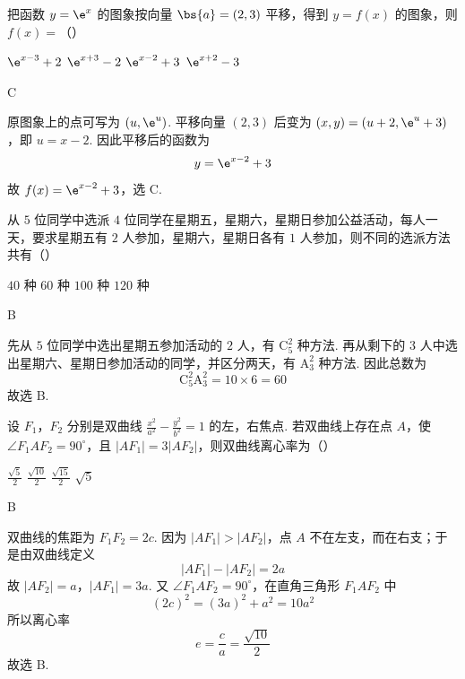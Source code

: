 \begin{problem}
把函数 \( y = \e^{x} \) 的图象按向量 \( \bs{a} = (2,3) \) 平移，得到 \( y = f(x) \) 的图象，则 \( f(x) = \)（\quad）

\choices
    {\(\e^{x - 3} + 2\)}
    {\(\e^{x + 3} - 2\)}
    {\(\e^{x - 2} + 3\)}
    {\(\e^{x + 2} - 3\)}
\end{problem}

\begin{answer}
C
\end{answer}

\begin{solution}
原图象上的点可写为 \((u,\e^u)\). 平移向量 \((2,3)\) 后变为 \((x,y)=(u+2,\e^u+3)\)，即 \(u=x-2\). 因此平移后的函数为
\[
y=\e^{x-2}+3
\]
故 \(f(x)=\e^{x-2}+3\)，选 C.
\end{solution}

\begin{problem}
从 \(5\) 位同学中选派 \(4\) 位同学在星期五，星期六，星期日参加公益活动，每人一天，要求星期五有 \(2\) 人参加，星期六，星期日各有 \(1\) 人参加，则不同的选派方法共有（\quad）

\choices
    {\(40\) 种}
    {\(60\) 种}
    {\(100\) 种}
    {\(120\) 种}
\end{problem}

\begin{answer}
B
\end{answer}

\begin{solution}
先从 \(5\) 位同学中选出星期五参加活动的 \(2\) 人，有 \(\mathrm C_5^2\) 种方法. 再从剩下的 \(3\) 人中选出星期六、星期日参加活动的同学，并区分两天，有 \(\mathrm A_3^2\) 种方法. 因此总数为
\[
\mathrm C_5^2\mathrm A_3^2=10\times6=60
\]
故选 B.
\end{solution}

\begin{problem}
设 \(F_{1}\)，\(F_{2}\) 分别是双曲线 \(\frac{x^{2}}{a^{2}} - \frac{y^{2}}{b^{2}} = 1\) 的左，右焦点. 若双曲线上存在点 \(A\)，使 \(\angle F_{1}AF_{2} = 90^{\circ}\)，且 \(|AF_{1}| = 3|AF_{2}|\)，则双曲线离心率为（\quad）

\choices
    {\(\frac{\sqrt{5}}{2}\)}
    {\(\frac{\sqrt{10}}{2}\)}
    {\(\frac{\sqrt{15}}{2}\)}
    {\(\sqrt{5}\)}
\end{problem}

\begin{answer}
B
\end{answer}

\begin{solution}
双曲线的焦距为 \(F_1F_2=2c\). 因为 \(|AF_1|>|AF_2|\)，点 \(A\) 不在左支，而在右支；于是由双曲线定义
\[
|AF_1|-|AF_2|=2a
\]
故 \(|AF_2|=a\)，\(|AF_1|=3a\). 又 \(\angle F_1AF_2=90^{\circ}\)，在直角三角形 \(F_1AF_2\) 中
\[
(2c)^2=(3a)^2+a^2=10a^2
\]
所以离心率
\[
e=\frac ca=\frac{\sqrt{10}}{2}
\]
故选 B.
\end{solution}

